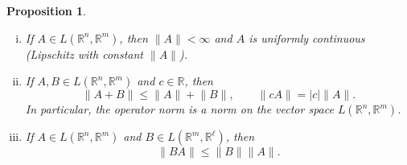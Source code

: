 \documentclass[12pt]{book}
\newcommand{\snorm}[1]{\lVert {#1} \rVert}
\newcommand{\abs}[1]{\left\lvert {#1} \right\rvert}
\newcommand{\R}{{\mathbb{R}}}
\theoremstyle{plain}
\newtheorem{prop}[thm]{Proposition}
\theoremstyle{remark}
\theoremstyle{definition}
\theoremstyle{exercise}
\theoremstyle{example}
\begin{document}
\begin{prop} \label{prop:finitedimpropnorm}
{\ }
\begin{enumerate}[(i)]
\item \label{item:finitedimpropnorm:i}
If $A \in L(\R^n,\R^m)$, then $\snorm{A} < \infty$ and
$A$ is uniformly continuous (Lipschitz with constant $\snorm{A}$).
\item \label{item:finitedimpropnorm:ii}
If $A,B \in L(\R^n,\R^m)$ and $c \in \R$, then
\begin{equation*}
\snorm{A+B} \leq \snorm{A}+\snorm{B}, \qquad \snorm{cA} = \abs{c}\snorm{A} .
\end{equation*}
In particular, the operator norm is a norm on the vector space $L(\R^n,\R^m)$.
\item \label{item:finitedimpropnorm:iii}
If $A \in L(\R^n,\R^m)$ and $B \in L(\R^m,\R^\ell)$, then
\begin{equation*}
\snorm{BA} \leq \snorm{B} \snorm{A} .
\end{equation*}
\end{enumerate}
\end{prop}
\end{document}
